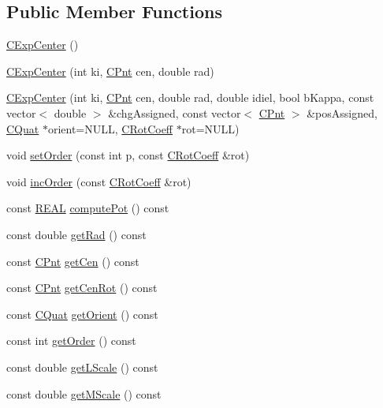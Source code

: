 \subsection*{Public Member Functions}
\begin{DoxyCompactItemize}
\item 
\hyperlink{classCExpCenter_abd3f14d423a6a1f8404380edb34f8d7c}{C\-Exp\-Center} ()
\item 
\hyperlink{classCExpCenter_a91bbc8f8561e58eeab18595df4f320b4}{C\-Exp\-Center} (int ki, \hyperlink{classCPnt}{C\-Pnt} cen, double rad)
\item 
\hyperlink{classCExpCenter_a8272991c2429ea236f18b2ae4fe33546}{C\-Exp\-Center} (int ki, \hyperlink{classCPnt}{C\-Pnt} cen, double rad, double idiel, bool b\-Kappa, const vector$<$ double $>$ \&chg\-Assigned, const vector$<$ \hyperlink{classCPnt}{C\-Pnt} $>$ \&pos\-Assigned, \hyperlink{classCQuat}{C\-Quat} $\ast$orient=N\-U\-L\-L, \hyperlink{classCRotCoeff}{C\-Rot\-Coeff} $\ast$rot=N\-U\-L\-L)
\item 
void \hyperlink{classCExpCenter_a6d4be76f4a28b68eca9dcd4a778ca387}{set\-Order} (const int p, const \hyperlink{classCRotCoeff}{C\-Rot\-Coeff} \&rot)
\item 
void \hyperlink{classCExpCenter_a91e9e5e3ffbf36281c1b7da46aa12c75}{inc\-Order} (const \hyperlink{classCRotCoeff}{C\-Rot\-Coeff} \&rot)
\item 
const \hyperlink{util_8h_a5821460e95a0800cf9f24c38915cbbde}{R\-E\-A\-L} \hyperlink{classCExpCenter_adff5ce73777a1d3045f0609dd0e955cf}{compute\-Pot} () const 
\item 
const double \hyperlink{classCExpCenter_adc18426f677b5984a468101ebfeefef6}{get\-Rad} () const 
\item 
const \hyperlink{classCPnt}{C\-Pnt} \hyperlink{classCExpCenter_a84f867868f8eb0785e95561f26cd0194}{get\-Cen} () const 
\item 
const \hyperlink{classCPnt}{C\-Pnt} \hyperlink{classCExpCenter_a69ce8d87ba63324aa16349019e6b71d4}{get\-Cen\-Rot} () const 
\item 
const \hyperlink{classCQuat}{C\-Quat} \hyperlink{classCExpCenter_a069965ee754068a0f59e3b80dbb8252c}{get\-Orient} () const 
\item 
const int \hyperlink{classCExpCenter_a18e5340638fc144dfa255cef7d5214d9}{get\-Order} () const 
\item 
const double \hyperlink{classCExpCenter_a30c3a26e0dc5bc9c2d84d366200243e5}{get\-L\-Scale} () const 
\item 
const double \hyperlink{classCExpCenter_ab58aa40813bf06929764f6b9ae4a25d1}{get\-M\-Scale} () const 

\end{DoxyCompactItemize}
